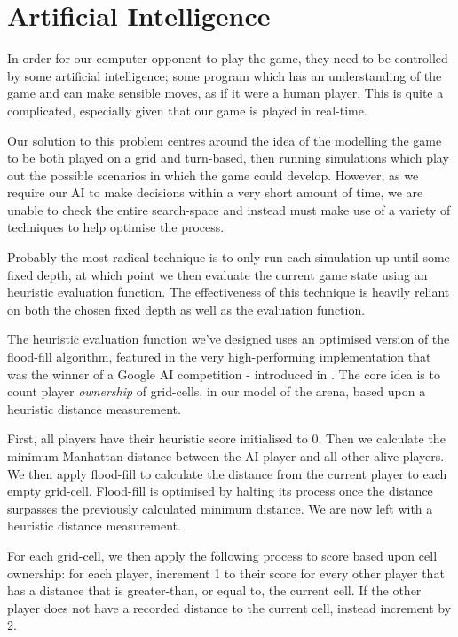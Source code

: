 \documentclass{standalone}
\begin{document}
	\section{Artificial Intelligence} \label{sec:design-ai}
		In order for our computer opponent to play the game, they need to be controlled by some artificial intelligence; some program which has an understanding of the game and can make sensible moves, as if it were a human player. This is quite a complicated, especially given that our game is played in real-time.

		Our solution to this problem centres around the idea of the modelling the game to be both played on a grid and turn-based, then running simulations which play out the possible scenarios in which the game could develop. However, as we require our AI to make decisions within a very short amount of time, we are unable to check the entire search-space and instead must make use of a variety of techniques to help optimise the process.

		Probably the most radical technique is to only run each simulation up until some fixed depth, at which point we then evaluate the current game state using an heuristic evaluation function. The effectiveness of this technique is heavily reliant on both the chosen fixed depth as well as the evaluation function.

		The heuristic evaluation function we've designed uses an optimised version of the flood-fill algorithm, featured in the very high-performing implementation that was the winner of a Google AI competition - introduced in . The core idea is to count player \emph{ownership} of grid-cells, in our model of the arena, based upon a heuristic distance measurement.

		First, all players have their heuristic score initialised to 0. Then we calculate the minimum Manhattan distance between the AI player and all other alive players. We then apply flood-fill to calculate the distance from the current player to each empty grid-cell. Flood-fill is optimised by halting its process once the distance surpasses the previously calculated minimum distance. We are now left with a heuristic distance measurement.

		For each grid-cell, we then apply the following process to score based upon cell ownership: for each player, increment 1 to their score for every other player that has a distance that is greater-than, or equal to, the current cell. If the other player does not have a recorded distance to the current cell, instead increment by 2.
\end{document}
